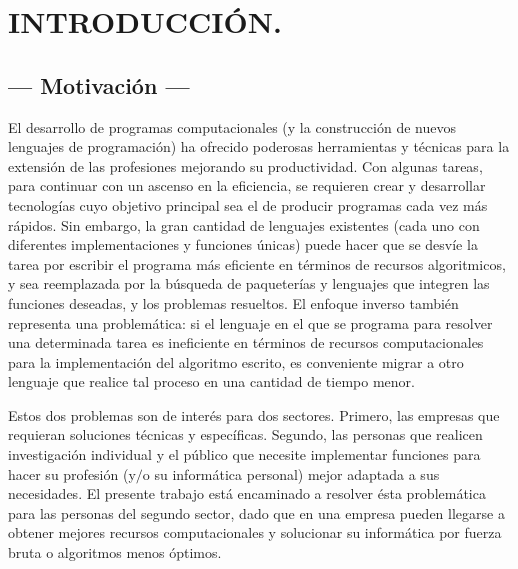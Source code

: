 \documentclass[11pt,a4paper]{article}
\begin{document}
\portada


\section{INTRODUCCIÓN.} %

\subsection{--- Motivación ---} %
\label{sub:motivacion}
El desarrollo de programas computacionales (y la construcción de nuevos lenguajes de programación) ha ofrecido poderosas herramientas y técnicas para la extensión de las profesiones mejorando su productividad.
Con algunas tareas, para continuar con un ascenso en la eficiencia, se requieren crear y desarrollar tecnologías cuyo objetivo principal sea el de producir programas cada vez más rápidos.
Sin embargo, la gran cantidad de lenguajes existentes (cada uno con diferentes implementaciones y funciones únicas) puede hacer que se desvíe la tarea por escribir el programa más eficiente en términos de recursos algoritmicos, y sea reemplazada por la búsqueda de paqueterías y lenguajes que integren las funciones deseadas, y los problemas resueltos.
El enfoque inverso también representa una problemática: si el lenguaje en el que se programa para resolver una determinada tarea es ineficiente en términos de recursos computacionales para la implementación del algoritmo escrito, es conveniente migrar a otro lenguaje que realice tal proceso en una cantidad de tiempo menor.

Estos dos problemas son de interés para dos sectores.
Primero, las empresas que requieran soluciones técnicas y específicas.
Segundo, las personas que realicen investigación individual y el público que necesite implementar funciones para hacer su profesión (y\(/\)o su informática personal) mejor adaptada a sus necesidades.
El presente trabajo está encaminado a resolver ésta problemática para las personas del segundo sector, dado que en una empresa pueden llegarse a obtener mejores recursos computacionales y solucionar su informática por fuerza bruta o algoritmos menos óptimos.
\end{document}

